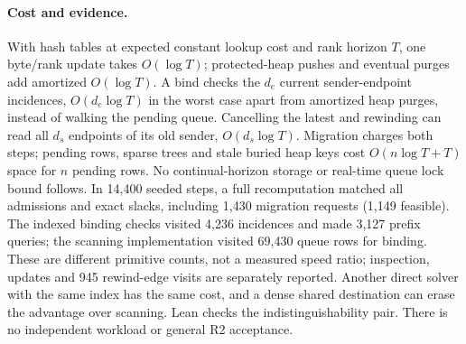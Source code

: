 \documentclass[11pt]{article}
\begin{document}
\paragraph{Cost and evidence.}
With hash tables at expected constant lookup cost and rank horizon \(T\),
one byte/rank update takes \(O(\log T)\); protected-heap pushes and
eventual purges add amortized \(O(\log T)\). A bind checks the \(d_e\)
current sender-endpoint incidences, \(O(d_e\log T)\) in the worst case
apart from amortized heap purges, instead of walking the pending queue.
Cancelling the latest and rewinding can read all \(d_s\) endpoints of its
old sender, \(O(d_s\log T)\). Migration charges both steps; pending rows,
sparse trees and stale buried heap keys cost \(O(n\log T+T)\) space
for \(n\) pending rows. No continual-horizon storage or real-time queue
lock bound follows. In 14,400 seeded steps, a full recomputation matched
all admissions and exact slacks, including 1,430 migration requests
(1,149 feasible). The indexed binding checks visited 4,236 incidences
and made 3,127 prefix queries; the scanning implementation visited
69,430 queue rows for binding. These are different primitive counts,
not a measured speed ratio; inspection, updates and 945 rewind-edge
visits are separately reported. Another direct solver with the same
index has the same cost, and a dense shared destination can erase the
advantage over scanning. Lean checks the indistinguishability pair.
There is no independent workload or general R2 acceptance.
\end{document}
